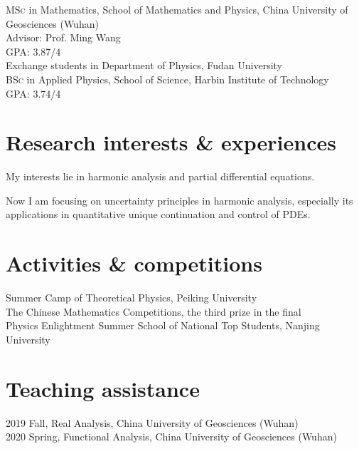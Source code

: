 \documentclass[11pt]{article} %
\begin{document}
\textsc{MSc} in Mathematics, School of Mathematics and Physics, China University of Geosciences (Wuhan)\\
Advisor: Prof. Ming Wang\\
GPA: 3.87/4 \\
 Exchange students in Department of Physics,  Fudan University\\
\textsc{BSc} in Applied Physics, School of Science, Harbin Institute of Technology \\
GPA: 3.74/4 


\section*{Research interests \& experiences}
My interests lie in harmonic analysis and partial differential equations.

Now I am focusing on uncertainty principles in harmonic analysis, especially its applications in quantitative unique continuation and control of PDEs. 

\section*{Activities \& competitions}
 Summer Camp of Theoretical Physics, Peiking University\\
 The Chinese Mathematics Competitions, the third prize  in the final\\
 Physics Enlightment Summer School of National Top Students, Nanjing University


\section*{Teaching assistance}
2019 Fall, Real Analysis, China University of Geosciences (Wuhan) \\
2020 Spring, Functional Analysis, China University of Geosciences (Wuhan)
\end{document}
